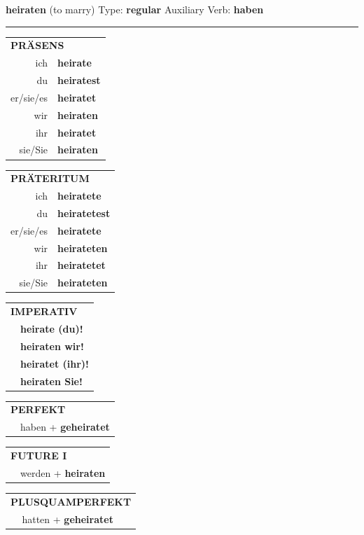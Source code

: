 \documentclass[10pt,a4paper]{revtex4-2}
\begin{document}
\begin{verbbox}
{\Large \bf heiraten} (to marry) \hfill Type: \textbf{regular} \hfill Auxiliary Verb: \textbf{haben} 

\vspace{5pt}
\hrule
\vspace{5pt}

\begin{tabular}{rl}
\multicolumn{2}{l}{\textbf{PRÄSENS}}\\
ich & \textbf{heirate}\\
du & \textbf{heiratest}\\
er/sie/es & \textbf{heiratet}\\
wir & \textbf{heiraten}\\
ihr & \textbf{heiratet}\\
sie/Sie & \textbf{heiraten}\\
\end{tabular}
\hfill
\begin{tabular}{rl}
\multicolumn{2}{l}{\textbf{PRÄTERITUM}}\\
ich & \textbf{heiratete}\\
du & \textbf{heiratetest}\\
er/sie/es & \textbf{heiratete}\\
wir & \textbf{heirateten}\\
ihr & \textbf{heiratetet}\\
sie/Sie & \textbf{heirateten}\\
\end{tabular}
\hfill
\begin{tabular}{rl}
\multicolumn{2}{l}{\textbf{IMPERATIV}}\\
& \textbf{heirate (du)!}\\
& \textbf{heiraten wir!}\\
& \textbf{heiratet (ihr)!}\\
& \textbf{heiraten Sie!}\\
\end{tabular}

\vspace{10pt}

\begin{tabular}{rl}
\multicolumn{2}{l}{\textbf{PERFEKT}}\\
& haben + \textbf{geheiratet}\\
\end{tabular}
\hfill
\begin{tabular}{rl}
\multicolumn{2}{l}{\textbf{FUTURE I}}\\
& werden + \textbf{heiraten}\\
\end{tabular}
\hfill
\begin{tabular}{rl}
\multicolumn{2}{l}{\textbf{PLUSQUAMPERFEKT}}\\
& hatten + \textbf{geheiratet}\\
\end{tabular}


\end{verbbox}
\end{document}
